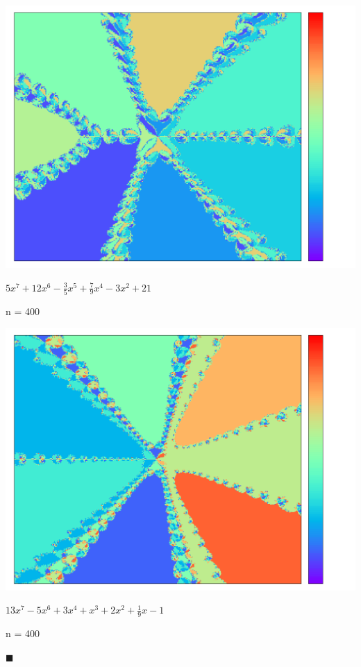 \documentclass{article}
\begin{document}
\begin{center}
\includegraphics[scale=.4]{5_12_-3:5_7:9_0_-3_0_21_400.png}

\emph{$5x^{7} + 12x^{6} - \frac{3}{5}x^{5} + \frac{7}{9}x^{4} - 3x^{2} + 21$}

n = 400

\bigskip

\includegraphics[scale=.4]{13_-5_0_3_1_2_1:9_-1_400.png}

\emph{$13x^{7} - 5x^{6} + 3x^{4} + x^{3} + 2x^{2} + \frac{1}{9}x - 1$}

n = 400

\end{center}

\begin{flushright}
$\blacksquare$
\end{flushright}
\end{document}
